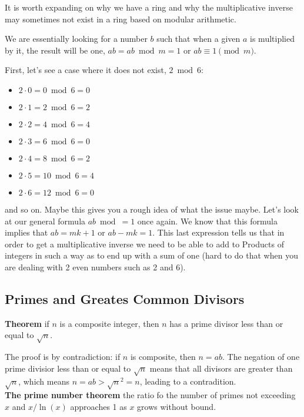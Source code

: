It is worth expanding on why we have a ring and why the multiplicative inverse may sometimes not exist
in a ring based on modular arithmetic.

We are essentially looking for a number $b$ such that when a given $a$ is multiplied by it, the result will be one,
$ab = ab \bmod m = 1$ or $ab \equiv 1 \pmod m$.

First, let's see a case where it does not exist, $2 \bmod 6$:
\begin{itemize}
    \item $2\cdot 0 = 0 \bmod 6 = 0$
    \item $2\cdot 1 = 2 \bmod 6 = 2$
    \item $2\cdot 2 = 4 \bmod 6 = 4$
    \item $2\cdot 3 = 6 \bmod 6 = 0$
    \item $2\cdot 4 = 8 \bmod 6 = 2$
    \item $2\cdot 5 = 10\bmod 6 = 4$
    \item $2\cdot 6 = 12\bmod 6 = 0$
\end{itemize}
and so on.
Maybe this gives you a rough idea of what the issue maybe.
Let's look at our general formula $ab \bmod = 1$ once again.
We know that this formula implies that $ab = mk + 1$ or $ab - mk = 1$.
This last expression tells us that in order to get a multiplicative inverse we need to be able to add to Products
of integers in such a way as to end up with a sum of one (hard to do that when you are dealing with 2 even numbers such as 2 and 6).




\subsection{Primes and Greates Common Divisors}

\textbf{Theorem} if $n$ is a composite integer, then $n$ has a prime divisor less than or equal to $\sqrt{n}$.

The proof is by contradiction: if $n$ is composite, then $n = ab$. The negation of one prime divisior
less than or equal to $\sqrt{n}$ means that all divisors are greater than $\sqrt{n}$, which means
$n = ab > \sqrt{n}^2 = n$, leading to a contradition.
\\


\textbf{The prime number theorem} the ratio fo the number of primes not exceeding $x$ and $x / \ln(x)$ approaches 1
as $x$ grows without bound.

